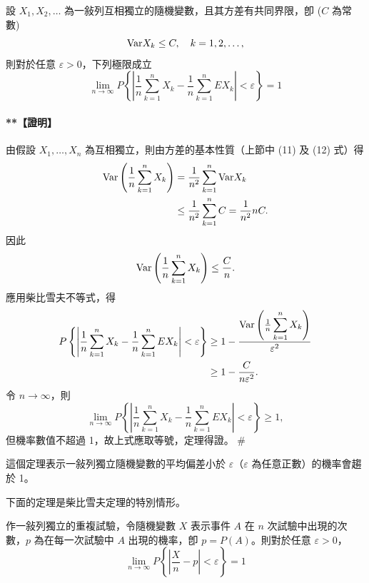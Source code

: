 \medskip
\begin{theorem*}[柴比雪夫定理]
設 $X_1, X_2, \dots$ 為一敍列互相獨立的隨機變數，且其方差有共同界限，卽 ($C$ 為常數)
\[
\text{Var} X_k \le C, \quad k = 1, 2, \dots,
\]
則對於任意 $\varepsilon > 0$，下列極限成立
\begin{equation}
\lim_{n \to \infty} P\left\{ \left| \frac{1}{n}\sum_{k=1}^n X_k - \frac{1}{n}\sum_{k=1}^n EX_k \right| < \varepsilon \right\} = 1 \tag{2}\label{eq:b5s-5-3-2}
\end{equation}
\end{theorem*}
\paragraph{**【證明】}
由假設 $X_1, \dots, X_n$ 為互相獨立，則由方差的基本性質（上節中 (11) 及 (12) 式）得
\begin{align*}
\text{Var}\left(\frac{1}{n}\sum_{k=1}^n X_k\right) &= \frac{1}{n^2}\sum_{k=1}^n \text{Var} X_k \\
&\le \frac{1}{n^2}\sum_{k=1}^n C = \frac{1}{n^2} nC.
\end{align*}
因此
\[
\text{Var}\left(\frac{1}{n}\sum_{k=1}^n X_k\right) \le \frac{C}{n}.
\]
應用柴比雪夫不等式，得
\begin{align*}
P\left\{ \left| \frac{1}{n}\sum_{k=1}^n X_k - \frac{1}{n}\sum_{k=1}^n EX_k \right| < \varepsilon \right\} &\ge 1 - \frac{\text{Var}\left(\frac{1}{n}\displaystyle\sum_{k=1}^n X_k\right)}{\varepsilon^2} \\
&\ge 1 - \frac{C}{n\varepsilon^2}.
\end{align*}
令 $n \to \infty$，則
\[
\lim_{n \to \infty} P\left\{ \left| \frac{1}{n}\sum_{k=1}^n X_k - \frac{1}{n}\sum_{k=1}^n EX_k \right| < \varepsilon \right\} \ge 1,
\]
但機率數值不超過 1，故上式應取等號，定理得證。 \hfill\#

這個定理表示一敍列獨立隨機變數的平均偏差小於 $\varepsilon$（$\varepsilon$ 為任意正數）的機率會趨於 1。

下面的定理是柴比雪夫定理的特別情形。

\medskip
\begin{theorem*}
作一敍列獨立的重複試驗，令隨機變數 $X$ 表示事件 $A$ 在 $n$ 次試驗中出現的次數，$p$ 為在每一次試驗中 $A$ 出現的機率，卽 $p = P(A)$。則對於任意 $\varepsilon > 0$，
\begin{equation}
\lim_{n \to \infty} P\left\{ \left| \frac{X}{n} - p \right| < \varepsilon \right\} = 1 \tag{3}\label{eq:b5s-5-3-3}
\end{equation}
\end{theorem*}
